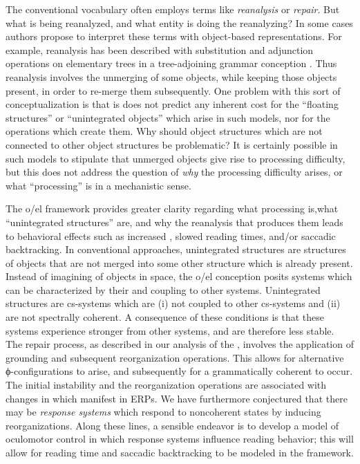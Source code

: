 The conventional vocabulary often employs terms like \textit{reanalysis} or \textit{repair}. But what is being reanalyzed, and what entity is doing the reanalyzing? In some cases authors propose to interpret these terms with object-based representations. For example, reanalysis has been described with substitution and adjunction operations on elementary trees in a tree-adjoining grammar conception \citep{FFerreiraEtAl2004}. Thus reanalysis involves the unmerging of some objects, while keeping those objects present, in order to re-merge them subsequently. One problem with this sort of conceptualization is that is does not predict any inherent cost for the “floating structures” or “unintegrated objects” which arise in such models, nor for the operations which create them. Why should object structures which are not connected to other object structures be problematic? It is certainly possible in such models to stipulate that unmerged objects give rise to processing difficulty, but this does not address the question of \textit{why} the processing difficulty arises, or what “processing” is in a mechanistic sense.

The o/el framework provides greater clarity regarding what processing is,\linebreak what “unintegrated structures” are, and why the reanalysis that produces them leads to behavioral effects such as increased , slowed reading times, and/or saccadic backtracking. In conventional approaches, unintegrated structures are structures of objects that are not merged into some other structure which is already present. Instead of imagining of objects in space, the o/el conception posits systems which can be characterized by their  and coupling to other systems. Unintegrated structures are cs-sys\-tems which are (i) not coupled to other cs-sys\-tems and (ii) are not spectrally coherent. A consequence of these conditions is that these systems experience stronger  from other systems, and are therefore less stable. The repair process, as described in our analysis of the , involves the application of grounding and subsequent reorganization operations. This allows for alternative ϕ-con\-fi\-gu\-ra\-tions to arise, and subsequently for a grammatically coherent  to occur. The initial instability and the reorganization operations are associated with changes in  which manifest in ERPs. We have furthermore conjectured that there may be \textit{ response systems} which respond to noncoherent states by inducing reorganizations. Along these lines, a sensible endeavor is to develop a model of oculomotor control in which  response systems influence reading behavior; this will allow for reading time and saccadic backtracking to be modeled in the framework.

